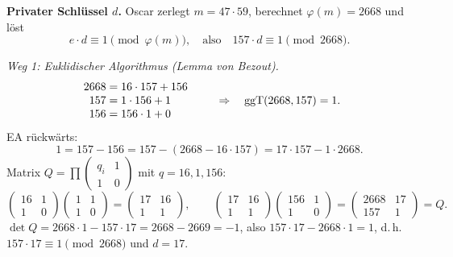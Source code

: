  \textbf{Privater Schlüssel $d$.}
Oscar zerlegt $m = 47 \cdot 59$, berechnet $\varphi(m) = 2668$ und löst
\[
e \cdot d \equiv 1 \pmod{\varphi(m)}, \quad\text{also}\quad 157 \cdot d \equiv 1 \pmod{2668}.
\]

\emph{Weg 1: Euklidischer Algorithmus (Lemma von Bezout).}
\[
\begin{array}{r@{\;=\;}l}
2668 & 16 \cdot 157 + 156\\
157 & 1 \cdot 156 + 1\\
156 & 156 \cdot 1 + 0
\end{array}
\qquad\Rightarrow\quad \ggT(2668, 157) = 1 .
\]
EA rückwärts:
\[
1 = 157 - 156 = 157 - (2668 - 16 \cdot 157) = 17 \cdot 157 - 1 \cdot 2668 .
\]
Matrix $Q = \prod \begin{pmatrix} q_i & 1\\ 1 & 0\end{pmatrix}$ mit $q = 16, 1, 156$:
\[
\begin{pmatrix}16&1\\1&0\end{pmatrix}\begin{pmatrix}1&1\\1&0\end{pmatrix} = \begin{pmatrix}17&16\\1&1\end{pmatrix},\qquad
\begin{pmatrix}17&16\\1&1\end{pmatrix}\begin{pmatrix}156&1\\1&0\end{pmatrix} = \begin{pmatrix}2668&17\\157&1\end{pmatrix} = Q .
\]
$\det Q = 2668 \cdot 1 - 157 \cdot 17 = 2668 - 2669 = -1$, also $157 \cdot 17 - 2668 \cdot 1 = 1$, d.\,h.
$157 \cdot 17 \equiv 1 \pmod{2668}$ und $d = 17$.

